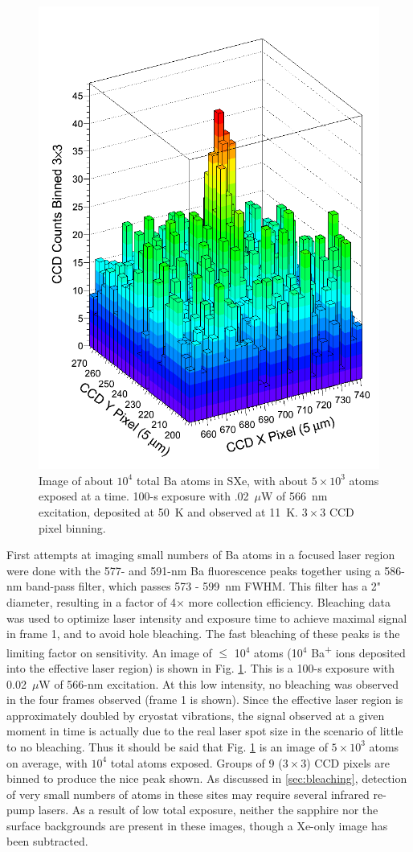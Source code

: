 \begin{figure} %
        \centering
                \includegraphics[width=.6\textwidth]{figures/image_1e4.png}
                \caption{Image of about $10^{4}$ total Ba atoms in SXe, with about $5 \times 10^{3}$ atoms exposed at a time.  100-s exposure with .02~$\mu$W of 566~nm excitation, deposited at 50~K and observed at 11~K.  $3 \times 3$ CCD pixel binning.}
\label{fig:image590s}
\end{figure}

First attempts at imaging small numbers of Ba atoms in a focused laser region were done with the 577- and 591-nm Ba fluorescence peaks together using a 586-nm band-pass filter, which passes 573 - 599~nm FWHM.  This filter has a 2" diameter, resulting in a factor of 4$\times$ more collection efficiency.  Bleaching data was used to optimize laser intensity and exposure time to achieve maximal signal in frame 1, and to avoid hole bleaching.  The fast bleaching of these peaks is the limiting factor on sensitivity.  An image of $\leq$ 10$^{4}$ atoms (10$^{4}$ Ba\textsuperscript{+} ions deposited into the effective laser region) is shown in Fig. \ref{fig:image590s}.  This is a 100-s exposure with 0.02~$\mu$W of 566-nm excitation.  At this low intensity, no bleaching was observed in the four frames observed (frame 1 is shown).  Since the effective laser region is approximately doubled by cryostat vibrations, the signal observed at a given moment in time is actually due to the real laser spot size in the scenario of little to no bleaching.  Thus it should be said that Fig. \ref{fig:image590s} is an image of $5 \times 10^{3}$ atoms on average, with $10^{4}$ total atoms exposed.  Groups of 9 ($3 \times 3$) CCD pixels are binned to produce the nice peak shown.  As discussed in \ref{sec:bleaching}, detection of very small numbers of atoms in these sites may require several infrared re-pump lasers.  As a result of low total exposure, neither the sapphire nor the surface backgrounds are present in these images, though a Xe-only image has been subtracted. 

